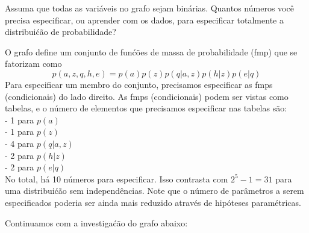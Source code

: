 \begin{exenumerate}
    
    \item Assuma que todas as vari\'aveis no grafo sejam bin\'arias. Quantos n\'umeros voc\^e precisa especificar, ou aprender com os dados, para especificar totalmente a distribui\'c\~ao de probabilidade?
    \begin{solution}
        O grafo define um conjunto de fun\'c\~oes de massa de probabilidade (fmp) que se fatorizam como
        $$ p(a,z,q,h,e) = p(a) p(z) p(q|a,z) p(h|z) p(e|q)$$
        Para especificar um membro do conjunto, precisamos especificar as fmps (condicionais) do lado direito. As fmps (condicionais) podem ser vistas como tabelas, e o n\'umero de elementos que precisamos especificar nas tabelas s\~ao:\\
        - 1 para $p(a)$ \\
        - 1 para $p(z)$ \\
        - 4 para $p(q | a,z)$ \\
        - 2 para $p(h | z)$\\
        - 2 para $p(e|q)$ \\
        No total, h\'a 10 n\'umeros para especificar. Isso contrasta com $2^5-1 = 31$ para uma distribui\'c\~ao sem independ\^encias.
        Note que o n\'umero de par\^ametros a serem especificados poderia ser ainda mais reduzido atrav\'es de hip\'oteses param\'etricas. 
        
    \end{solution}
    
\end{exenumerate}


Continuamos com a investiga\'c\~ao do grafo abaixo:

\begin{center}
\end{center}

